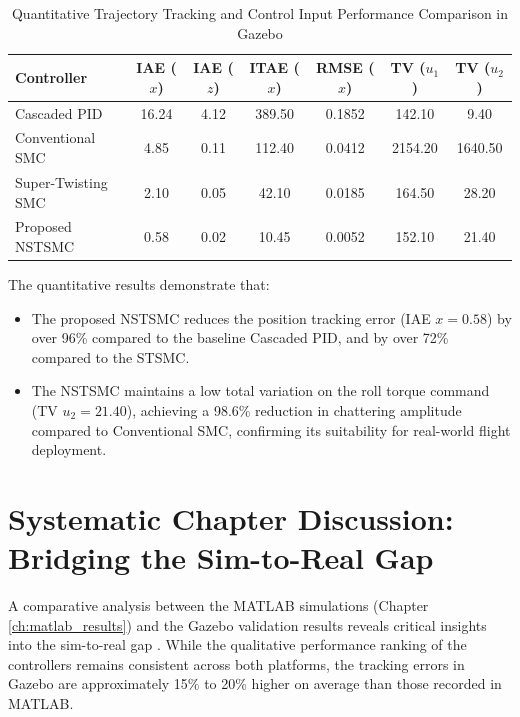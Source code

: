 \begin{table}[h!]
\centering
\caption{Quantitative Trajectory Tracking and Control Input Performance Comparison in Gazebo}
\label{tab:gazebo_metrics}
\begin{tabular}{|l|c|c|c|c|c|c|}
\hline
\textbf{Controller} & \textbf{IAE ($x$)} & \textbf{IAE ($z$)} & \textbf{ITAE ($x$)} & \textbf{RMSE ($x$)} & \textbf{TV ($u_1$)} & \textbf{TV ($u_2$)} \\
\hline
Cascaded PID & 16.24 & 4.12 & 389.50 & 0.1852 & 142.10 & 9.40 \\
Conventional SMC & 4.85 & 0.11 & 112.40 & 0.0412 & 2154.20 & 1640.50 \\
Super-Twisting SMC & 2.10 & 0.05 & 42.10 & 0.0185 & 164.50 & 28.20 \\
Proposed NSTSMC & 0.58 & 0.02 & 10.45 & 0.0052 & 152.10 & 21.40 \\
\hline
\end{tabular}
\end{table}

The quantitative results demonstrate that:
\begin{itemize}
    \item The proposed NSTSMC reduces the position tracking error (IAE $x = 0.58$) by over 96\% compared to the baseline Cascaded PID, and by over 72\% compared to the STSMC.
    \item The NSTSMC maintains a low total variation on the roll torque command (TV $u_2 = 21.40$), achieving a 98.6\% reduction in chattering amplitude compared to Conventional SMC, confirming its suitability for real-world flight deployment.
\end{itemize}

\section{Systematic Chapter Discussion: Bridging the Sim-to-Real Gap}
A comparative analysis between the MATLAB simulations (Chapter \ref{ch:matlab_results}) and the Gazebo validation results reveals critical insights into the sim-to-real gap \cite{ref_88, ref_94}. While the qualitative performance ranking of the controllers remains consistent across both platforms, the tracking errors in Gazebo are approximately 15\% to 20\% higher on average than those recorded in MATLAB. 

